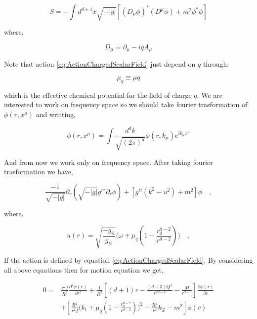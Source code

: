\begin{equation} \label{eq:ActionChargedScalarField} 
    S = - \int d^{d+1}x \sqrt{-|g|} \left[ (D_\mu\phi)^*(D^\mu\phi) + m^2\phi^*\phi \right] 
\end{equation}

where,

\begin{equation}
    D_\mu = \partial_\mu - iqA_\mu
\end{equation}

Note that action \ref{eq:ActionChargedScalarField} just depend on $q$ through:

\begin{equation}
    \mu_q \equiv \mu q 
\end{equation}

which is the effective chemical potential for the field of charge $q$. We are interested to work on frequency space so we should take fourier trasformation of $\phi(r,x^\mu)$ and writting,

\begin{equation}
    \phi(r,x^\mu) = \int \frac{d^dk}{\sqrt{(2\pi)^d}} \phi(r,k_\mu) e^{ik_\mu x^\mu} 
\end{equation}

And from now we work only on frequency space. After taking fourier trasformation we have,

\begin{equation}
    \frac{-1}{\sqrt{-|g|}} \partial_r (\sqrt{-|g|} g^{rr} \partial_r\phi) + \left[ g^{ii} (k^2 - u^2) + m^2 \right]\phi \quad ,
\end{equation}

where,

\begin{equation}
    u(r) = \sqrt{\frac{-g_{ii}}{g_{tt}}}\bigg(\omega + \mu_q(1-\frac{r_0^{d-2}}{r^{d-2}})\bigg) \quad ,
\end{equation}

If the action is defined by equation \ref{eq:ActionChargedScalarField}. By considering all above equations then for motion equation we get,

\begin{align} \label{eq:equationofmotionchargeblackholeinadsinchargescalarfield}
    0 =& \frac{r^2f}{R^2}\frac{\partial^2\phi(r)}{\partial r^2} + \frac{1}{R^2}\left[(d+1)r - \frac{(d-3)Q^2}{r^{2d-3}} - \frac{M}{r^{d-1}} \right]\frac{\partial \phi(r)}{\partial r} \nonumber\\ 
      & + \left[ \frac{R^2}{r^2f}\bigg(k_t + \mu_q(1-\frac{r_0^{d-2}}{r^{d-2}})\bigg)^2-\frac{R^2}{r^2}k_{\vec{x}}-m^2\right]\phi(r) 
\end{align}

